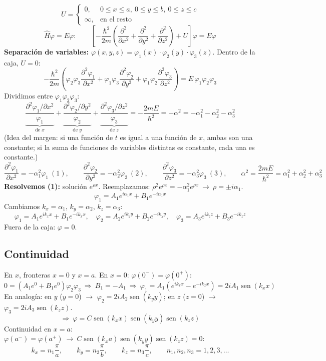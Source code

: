 \documentclass[11pt,a4paper]{article}
\DeclareMathOperator{\sen}{sen}
\begin{document}
\[
U=\begin{cases}0, & 0\le x\le a,\ 0\le y\le b,\ 0\le z\le c\\ \infty, & \text{en el resto}\end{cases}
\]
\[
\hat H\varphi=E\varphi:\qquad
\left[-\frac{\hbar^2}{2m}\left(\frac{\partial^2}{\partial x^2}+\frac{\partial^2}{\partial y^2}+\frac{\partial^2}{\partial z^2}\right)+U\right]\varphi=E\varphi
\]
\textbf{Separación de variables:} $\varphi(x,y,z)=\varphi_1(x)\cdot\varphi_2(y)\cdot\varphi_3(z)$. Dentro de la caja, $U=0$:
\[
-\frac{\hbar^2}{2m}\left(\varphi_2\varphi_3\frac{\partial^2\varphi_1}{\partial x^2}+\varphi_1\varphi_3\frac{\partial^2\varphi_2}{\partial y^2}+\varphi_1\varphi_2\frac{\partial^2\varphi_3}{\partial z^2}\right)=E\,\varphi_1\varphi_2\varphi_3
\]
Dividimos entre $\varphi_1\varphi_2\varphi_3$:
\[
\underbrace{\frac{\partial^2\varphi_1/\partial x^2}{\varphi_1}}_{\text{de }x}+\underbrace{\frac{\partial^2\varphi_2/\partial y^2}{\varphi_2}}_{\text{de }y}+\underbrace{\frac{\partial^2\varphi_3/\partial z^2}{\varphi_3}}_{\text{de }z}
=-\frac{2mE}{\hbar^2}=-\alpha^2=-\alpha_1^2-\alpha_2^2-\alpha_3^2
\]
(Idea del margen: si una función de $t$ es igual a una función de $x$, ambas son una constante; si la suma de funciones
de variables distintas es constante, cada una es constante.)
\[
\frac{\partial^2\varphi_1}{\partial x^2}=-\alpha_1^2\varphi_1\ (1),\qquad
\frac{\partial^2\varphi_2}{\partial y^2}=-\alpha_2^2\varphi_2\ (2),\qquad
\frac{\partial^2\varphi_3}{\partial z^2}=-\alpha_3^2\varphi_3\ (3),\qquad
\alpha^2=\frac{2mE}{\hbar^2}=\alpha_1^2+\alpha_2^2+\alpha_3^2
\]
\textbf{Resolvemos (1):} solución $e^{\rho x}$. Reemplazamos: $\rho^2e^{\rho x}=-\alpha_1^2e^{\rho x}\ \rightarrow\ \rho=\pm i\alpha_1$.
\[
\varphi_1=A_1e^{i\alpha_1x}+B_1e^{-i\alpha_1x}
\]
Cambiamos $k_x=\alpha_1$, $k_y=\alpha_2$, $k_z=\alpha_3$:
\[
\varphi_1=A_1e^{ik_xx}+B_1e^{-ik_xx},\quad \varphi_2=A_2e^{ik_yy}+B_2e^{-ik_yy},\quad \varphi_3=A_3e^{ik_zz}+B_3e^{-ik_zz}
\]
Fuera de la caja: $\varphi=0$.

\subsection{Continuidad}
En $x$, fronteras $x=0$ y $x=a$. En $x=0$: $\varphi(0^-)=\varphi(0^+)$:
\[
0=(A_1e^0+B_1e^0)\varphi_2\varphi_3\ \Rightarrow\ B_1=-A_1\ \Rightarrow\ \varphi_1=A_1(e^{ik_xx}-e^{-ik_xx})=2iA_1\sen(k_xx)
\]
En analogía: en $y$ ($y=0$) $\rightarrow$ $\varphi_2=2iA_2\sen(k_yy)$; en $z$ ($z=0$) $\rightarrow$ $\varphi_3=2iA_3\sen(k_zz)$.
\[
\Rightarrow\ \varphi=C\sen(k_xx)\sen(k_yy)\sen(k_zz)
\]
Continuidad en $x=a$: $\varphi(a^-)=\varphi(a^+)\ \rightarrow\ C\sen(k_xa)\sen(k_yy)\sen(k_zz)=0$:
\[
k_x=n_1\frac{\pi}{a},\qquad k_y=n_2\frac{\pi}{b},\qquad k_z=n_3\frac{\pi}{c},\qquad n_1,n_2,n_3=1,2,3,\ldots
\]
\end{document}
